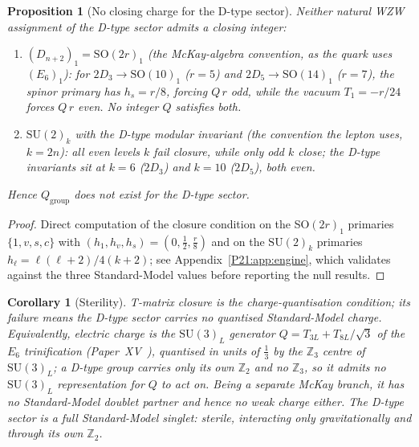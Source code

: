 \documentclass[11pt,a4paper]{article}
\newtheorem{proposition}[theorem]{Proposition}
\newtheorem{corollary}[theorem]{Corollary}
\theoremstyle{definition}\newtheorem{definition}[theorem]{Definition}
\theoremstyle{remark}
\newcommand{\SU}{\mathrm{SU}}
\newcommand{\SO}{\mathrm{SO}}
\newcommand{\twoD}{2D}
\newcommand{\Qgr}{Q_{\mathrm{group}}}
\newcommand{\Ztwo}{\mathbb{Z}_2}
\newcommand{\Zthree}{\mathbb{Z}_3}
\begin{document}
\begin{proposition}[No closing charge for the D-type sector]
\label{P21:prop:noclosure}
Neither natural WZW assignment of the D-type sector admits a closing
integer:
\begin{enumerate}[noitemsep,label=(\alph*)]
\item $(D_{n+2})_1=\SO(2r)_1$ (the McKay-algebra convention, as the quark
uses $(E_6)_1$): for $\twoD_3\to\SO(10)_1$ ($r=5$) and
$\twoD_5\to\SO(14)_1$ ($r=7$), the spinor primary has $h_s=r/8$, forcing
$Q\,r$ odd, while the vacuum $T_1=-r/24$ forces $Q\,r$ even. No integer
$Q$ satisfies both.
\item $\SU(2)_k$ with the D-type modular invariant (the convention the
lepton uses, $k=2n$): all even levels $k$ fail closure, while only odd
$k$ close; the D-type invariants sit at $k=6$ ($\twoD_3$) and $k=10$
($\twoD_5$), both even.
\end{enumerate}
Hence $\Qgr$ does not exist for the D-type sector.
\end{proposition}
\begin{proof}
Direct computation of the closure condition on the SO$(2r)_1$ primaries
$\{1,v,s,c\}$ with $(h_1,h_v,h_s)=(0,\tfrac12,\tfrac r8)$ and on the
$\SU(2)_k$ primaries $h_\ell=\ell(\ell+2)/4(k+2)$; see
Appendix~\ref{P21:app:engine}, which validates against the three
Standard-Model values before reporting the null results.
\end{proof}

\begin{corollary}[Sterility]
\label{P21:cor:sterile}
T-matrix closure is the charge-quantisation condition; its failure means
the D-type sector carries \emph{no} quantised Standard-Model charge.
Equivalently, electric charge is the $\SU(3)_L$ generator
$Q=T_{3L}+T_{8L}/\sqrt3$ of the $E_6$ trinification
(Paper~XV~\cite{Paper15}), quantised in units of $\tfrac13$ by the
$\Zthree$ centre of $\SU(3)_L$; a D-type group carries only its own
$\Ztwo$ and no $\Zthree$, so it admits no $\SU(3)_L$ representation for
$Q$ to act on. Being a separate McKay branch, it has no Standard-Model
doublet partner and hence no weak charge either. The D-type sector is a
full Standard-Model singlet: \emph{sterile}, interacting only
gravitationally and through its own $\Ztwo$.
\end{corollary}

\end{document}

